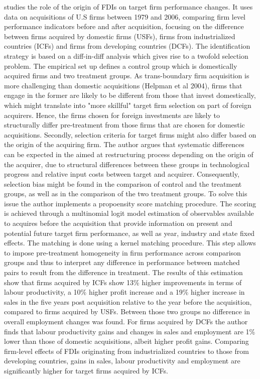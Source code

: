 \documentclass[11pt,a4paper,leqno]{article}
\begin{document}
\cite{chen2011} studies the role of the origin of FDIs on target firm performance changes.
It uses data on acquisitions of U.S firms between 1979 and 2006, comparing firm level performance indicators before and after acquisition, focusing on the difference between firms acquired by domestic firms (USFs), firms from industrialized countries (ICFs) and firms from developing countries (DCFs). The identification strategy is based on a diff-in-diff analysis which gives rise to a twofold selection problem. The empirical set up defines a control group which is domestically acquired firms and two treatment groups. As trans-boundary firm acquisition is more challenging than domestic acquisitions (Helpman et al 2004), firms that engage in the former are likely to be different from those that invest domestically, which might translate into "more skillful" target firm selection on part of foreign acquirers. Hence, the firms chosen for foreign investments are likely to structurally differ pre-treatment from those firms that are chosen for domestic acquisitions. Secondly, selection criteria for target firms might also differ based on the origin of the acquiring firm. The author argues that systematic differences can be expected in the aimed at restructuring process depending on the origin of the acquirer, due to structural differences between these groups in technological progress and relative input costs between target and acquirer. Consequently, selection bias might be found in the comparison of control and the treatment groups, as well as in the comparison of the two treatment groups. To solve this issue the author implements a propoensity score matching procedure. The scoring is achieved through a multinomial logit model estimation
of observables available to acquires before the acquisition that provide information on present and potential future target firm performance, as well as year, industry and state
fixed effects. The matching is done using a kernel matching procedure. This step allows to
impose pre-treatment homogeneity in firm performance across comparison groups and thus to
interpret any difference in performance between matched pairs to result from the difference in treatment. The results of this estimation show that firms acquired by ICFs show 13\% higher improvements in terms of labour productivity, a 10\% higher profit increase and a 19\% higher increase in sales in the five years post acquisition relative to the year before the acquisition, compared to firms acquired by USFs. Between those two groups no difference in overall employment changes was found. For firms acquired by DCFs the author finds that labour productivity gains and changes in sales and employment are 1\% lower than those of domestic acquisitions, albeit higher profit gains. Comparing firm-level effects of FDIs originating from industrialized countries to those from developing countries, gains in sales, labour productivity and employment are significantly higher for target firms acquired by ICFs.
\end{document}
